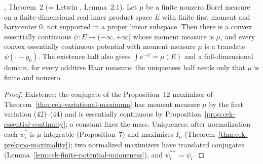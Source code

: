 \begin{theorem}
  \label{thm:cek-moment-measures}
  \leanok
  \cite{CorderoKlartag2015}, Theorem~2 (= Letwin \cite{Letwin2026QuadraticKLS}, Lemma~2.1). Let $\mu$ be a finite nonzero
  Borel measure on a finite-dimensional real inner product space $E$ with finite first moment and barycenter $0$, not
  supported in a proper linear subspace. Then there is a convex essentially continuous $\psi\colon E\to(-\infty,+\infty]$
  whose moment measure is $\mu$, and every convex essentially continuous potential with moment measure $\mu$ is a
  translate $\psi(\cdot-y_0)$. The existence half also gives $\int e^{-\psi}=\mu(E)$ and a full-dimensional domain, for
  every additive Haar measure; the uniqueness half needs only that $\mu$ is finite and nonzero.
\end{theorem}
\begin{proof}
  \leanok
  Existence: the conjugate of the Proposition~12 maximizer of Theorem~\ref{thm:cek-variational-maximum} has moment
  measure $\mu$ by the first variation (42)--(44) and is essentially continuous by
  Proposition~\ref{prop:cek-essential-continuity}; a constant fixes the mass. Uniqueness: after normalization each
  $\psi_i^*$ is $\mu$-integrable (Proposition~7) and maximizes $I_\mu$ (Theorem~\ref{thm:cek-prekopa-maximality}); two
  normalized maximizers have translated conjugates (Lemma~\ref{lem:cek-finite-potential-uniqueness}), and
  $\psi_i^{**}=\psi_i$.
\end{proof}

